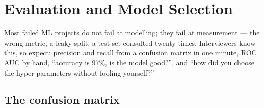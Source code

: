 \chapter{Evaluation and Model Selection}
\label{ch:eval}
Most failed ML projects do not fail at modelling; they fail at measurement --- the wrong metric, a leaky
split, a test set consulted twenty times. Interviewers know this, so expect: precision and recall from a
confusion matrix in one minute, ROC AUC by hand, ``accuracy is 97\%, is the model good?'', and ``how did
you choose the hyper-parameters without fooling yourself?''

\section{The confusion matrix}


